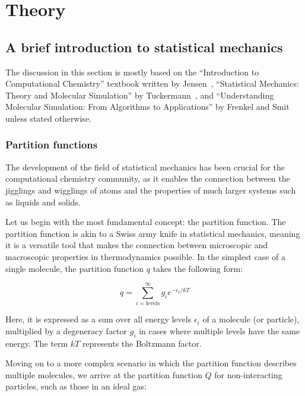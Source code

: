 \chapter{Theory}

\section{A brief introduction to statistical mechanics}
The discussion in this section is mostly based on the ``Introduction to Computational Chemistry'' textbook written by Jensen~\citep{jensenIntroductionComputationalChemistry2017}, ``Statistical Mechanics: Theory and Molecular Simulation'' by Tuckermann~\citep{tuckermanStatisticalMechanicsTheory2023}, and ``Understanding Molecular Simulation: From Algorithms to Applications'' by Frenkel and Smit~\citep{frenkelUnderstandingMolecularSimulation2002} unless stated otherwise.



\subsection{Partition functions}
The development of the field of statistical mechanics has been crucial for the computational chemistry community, as it enables the connection between the jigglings and wigglings of atoms and the properties of much larger systems such as liquids and solids.

Let us begin with the most fundamental concept: the partition function. The partition function is akin to a Swiss army knife in statistical mechanics, meaning it is a versatile tool that makes the connection between microscopic and macroscopic properties in thermodynamics possible. In the simplest case of a single molecule, the partition function $q$ takes the following form:

\begin{equation}
    q = \sum_{i = \text{levels}}^{\infty} g_i e^{-\epsilon_i/kT}
\end{equation}

Here, it is expressed as a sum over all energy levels $\epsilon_i$ of a molecule (or particle), multiplied by a degeneracy factor $g_i$ in cases where multiple levels have the same energy. The term $kT$ represents the Boltzmann factor.

Moving on to a more complex scenario in which the partition function describes multiple molecules, we arrive at the partition function $Q$ for non-interacting particles, such as those in an ideal gas:

